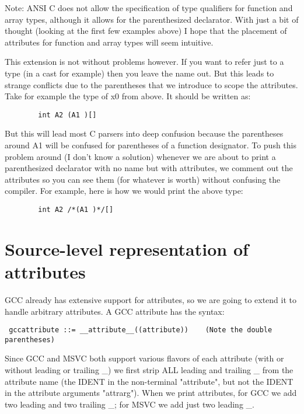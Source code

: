 \documentclass{book}
\begin{document}
 Note: ANSI C does not allow the specification of type qualifiers for function
and array types, although it allows for the parenthesized declarator. With
just a bit of thought (looking at the first few examples above) I hope that
the placement of attributes for function and array types will seem intuitive.

 This extension is not without problems however. If you want to refer just to
a type (in a cast for example) then you leave the name out. But this leads to
strange conflicts due to the parentheses that we introduce to scope the
attributes. Take for example the type of x0 from above. It should be written
as: 
 
\begin{verbatim}
        int A2 (A1 )[]
\end{verbatim}

 But this will lead most C parsers into deep confusion because the parentheses
around A1 will be confused for parentheses of a function designator. To push
this problem around (I don't know a solution) whenever we are about to print a
parenthesized declarator with no name but with attributes, we comment out the
attributes so you can see them (for whatever is worth) without confusing the
compiler. For example, here is how we would print the above type:

\begin{verbatim}
        int A2 /*(A1 )*/[]
\end{verbatim}

 
 \section{Source-level representation of attributes}

 GCC already has extensive support for attributes, so we are going to extend
it to handle arbitrary attributes. A GCC attribute has the syntax:
 
\begin{verbatim}
 gccattribute ::= __attribute__((attribute))    (Note the double parentheses)
\end{verbatim}

 Since GCC and MSVC both support various flavors of each attribute (with or
without leading or trailing \_) we first strip ALL leading and trailing \_ from
the attribute name (the IDENT in the non-terminal "attribute", but not the
IDENT in the attribute arguments "attrarg"). When we print attributes, for GCC
we add two leading and two trailing \_; for MSVC we add just two leading \_.
 
\end{document}
